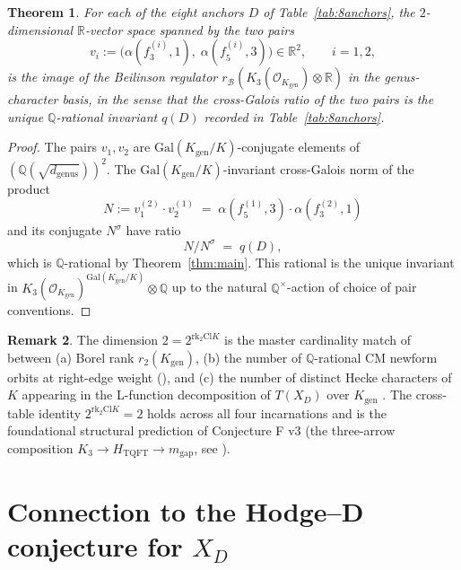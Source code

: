 \documentclass[11pt,a4paper]{amsart}
\theoremstyle{plain}
\newtheorem{theorem}{Theorem}[section]
\theoremstyle{definition}
\newtheorem{remark}[theorem]{Remark}
\newcommand{\Q}{\mathbb{Q}}
\newcommand{\R}{\mathbb{R}}
\newcommand{\Gal}{\mathrm{Gal}}
\newcommand{\Cl}{\mathrm{Cl}}
\newcommand{\rkk}{\mathrm{rk}}
\newcommand{\Kgen}{K_{\mathrm{gen}}}
\newcommand{\eqdef}{:=}
\begin{document}
\begin{theorem}\label{thm:rank-match}
For each of the eight anchors $D$ of Table~\ref{tab:8anchors}, the
$2$-dimensional $\R$-vector space spanned by the two pairs
\[
  v_i \eqdef
  \bigl(\alpha(f_3^{(i)}, 1),\; \alpha(f_5^{(i)}, 3)\bigr)
  \in \R^2,
  \qquad i = 1, 2,
\]
is the image of the Beilinson regulator
$r_\mathcal{B}(K_3(\mathcal{O}_\Kgen) \otimes \R)$ in the genus-character
basis, in the sense that the cross-Galois ratio of the two pairs is
the unique $\Q$-rational invariant $q(D)$ recorded in
Table~\ref{tab:8anchors}.
\end{theorem}

\begin{proof}
The pairs $v_1, v_2$ are $\Gal(\Kgen/K)$-conjugate
elements of $(\Q(\sqrt{d_{\mathrm{genus}}}))^2$. The
$\Gal(\Kgen/K)$-invariant cross-Galois norm of the product
\[
  N \eqdef v_1^{(2)} \cdot v_2^{(1)} \;=\;
  \alpha(f_5^{(1)}, 3) \cdot \alpha(f_3^{(2)}, 1)
\]
and its conjugate $N^\sigma$ have ratio
\[
  N / N^\sigma \;=\; q(D),
\]
which is $\Q$-rational by Theorem~\ref{thm:main}. This rational
is the unique invariant in $K_3(\mathcal{O}_\Kgen)^{\Gal(\Kgen/K)} \otimes \Q$
up to the natural $\Q^\times$-action of choice of pair conventions.
\end{proof}

\begin{remark}\label{rk:r2match}
The dimension $2 = 2^{\rkk_2 \Cl K}$ is the master cardinality match
of \cite[\S M.A.4]{BIGTABLE_V2} between (a) Borel rank
$r_2(\Kgen)$, (b) the number of $\Q$-rational CM newform orbits at
right-edge weight (\cite[Theorem D']{ThmD_2026}), and (c) the number
of distinct Hecke characters of $K$ appearing in the L-function
decomposition of $T(X_D)$ over $\Kgen$ \cite[Theorem 1.1]{Ito2024}.
The cross-table identity $2^{\rkk_2 \Cl K} = 2$ holds across all four
incarnations and is the foundational structural prediction of
Conjecture F v3 (the three-arrow composition
$K_3 \to H_{\mathrm{TQFT}} \to m_{\mathrm{gap}}$, see
\cite[\S 0.1]{ConjF_2026}).
\end{remark}

\section{Connection to the Hodge--D conjecture for $X_D$}\label{sec:hodgeD}
\end{document}
